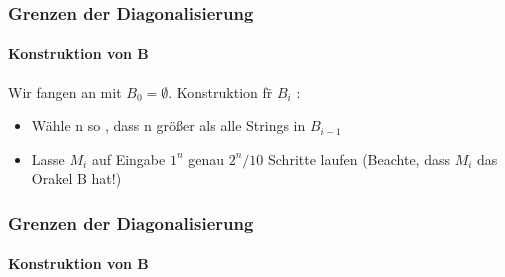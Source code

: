 \begin{frame}
	\frametitle{Grenzen der Diagonalisierung}
	\framesubtitle{Konstruktion von B}
	Wir fangen an mit $B_0 = \emptyset$. Konstruktion f\"r $B_i$ :
	\begin{itemize}[<+->]
		\item Wähle n so , dass n größer als alle Strings in $B_{i-1}$
		\item Lasse $M_i$ auf Eingabe $1^n$ genau $2^n / 10$ Schritte laufen \newline
			(Beachte, dass $M_i$ das Orakel B hat!)
	\end{itemize}
\end{frame}
\begin{frame}
	\frametitle{Grenzen der Diagonalisierung}
	\framesubtitle{Konstruktion von B}
	\begin{columns}
	

\end{columns}
\end{frame}
